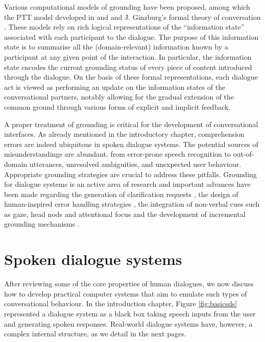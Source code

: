 Various computational models of grounding have been proposed, among which the PTT model developed in \cite{COIN:COIN042} and \cite{MathesonPT00} and J. Ginzburg's formal theory of conversation \citep{Ginzburg2012}.  These models rely on rich logical representations of the ``information state'' associated with each participant to the dialogue.  The purpose of this information state is to summarise all the (domain-relevant) information known by a participant at any given point of the interaction. In particular, the information state encodes the current grounding status of every piece of content introduced through the dialogue. On the basis of these formal representations, each dialogue act is viewed as performing an update on the information states of the conversational partners, notably allowing for the gradual extension of the common ground through various forms of explicit and implicit feedback. 

A proper treatment of grounding is critical for the development of conversational interfaces.  As already mentioned in the introductory chapter, comprehension errors are indeed ubiquitous in spoken dialogue systems.  The potential sources of misunderstandings are abundant, from error-prone speech recognition to out-of-domain utterances, unresolved ambiguities, and unexpected user behaviour.  Appropriate grounding strategies are crucial to address these pitfalls. Grounding for dialogue systems is an active area of research and important advances have been made regarding the generation of clarification requests \citep{Purver04Thesis,Rieser:2005}, the design of human-inspired error handling strategies \citep{Skantze2007}, the integration of non-verbal cues such as gaze, head nods and attentional focus \citep{Nakano:2003} and the development of incremental grounding mechanisms \citep{visser_toward_2012}. 

\section{Spoken dialogue systems}
\label{sec:sds}

After reviewing some of the core properties of human dialogues, we now discuss how to develop practical computer systems that aim to emulate such types of conversational behaviour.   In the introduction chapter, Figure \ref{fig:basicsds} represented a dialogue system as a black box taking speech inputs from the user and generating spoken responses.  Real-world dialogue systems have, however, a complex internal structure, as we detail in the next pages.

